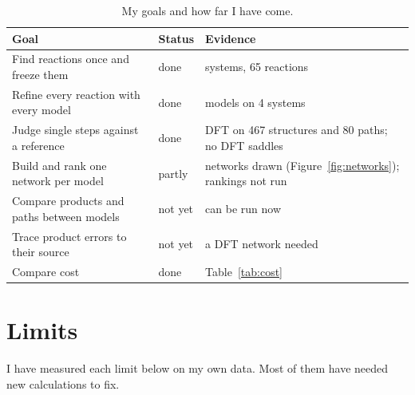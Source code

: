 \documentclass[11pt]{article}
\begin{document}
\begin{table}[htbp]
\centering
\caption{My goals and how far I have come.}
\label{tab:goals}
\small
\begin{tabularx}{\linewidth}{@{}>{\raggedright\arraybackslash}Xl
>{\raggedright\arraybackslash}X@{}}
\toprule
Goal & Status & Evidence \\
\midrule
Find reactions once and freeze them & done & 4 systems, 65 reactions \\
Refine every reaction with every model & done & 5 models on 4 systems \\
Judge single steps against a reference & done & DFT on 467 structures
and 80 paths; no DFT saddles \\
Build and rank one network per model & partly & networks drawn
(Figure~\ref{fig:networks}); rankings not run \\
Compare products and paths between models & not yet & can be run now \\
Trace product errors to their source & not yet & a DFT network needed \\
Compare cost & done & Table~\ref{tab:cost} \\
\bottomrule
\end{tabularx}
\end{table}

\section{Limits}
\label{sec:limits}

I have measured each limit below on my own data. Most of them have needed
new calculations to fix.
\end{document}
